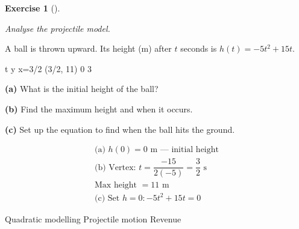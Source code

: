 \documentclass[
  letterpaper,
  DIV=11,
  numbers=noendperiod]{scrreprt}
\theoremstyle{definition}
\newtheorem{exercise}{Exercise}[chapter]
\theoremstyle{remark}
\begin{document}
\begin{exercise}[]\protect\hypertarget{exr-u7-30}{}\label{exr-u7-30}

\emph{Analyse the projectile model.}

A ball is thrown upward. Its height (m) after \(t\) seconds is
\(h(t) = -5t^2 + 15t\).

t y x=3/2 (3/2, 11) 0 3

\textbf{(a)} What is the initial height of the ball?

\textbf{(b)} Find the maximum height and when it occurs.

\textbf{(c)} Set up the equation to find when the ball hits the ground.

\begin{tcolorbox}[enhanced jigsaw, opacitybacktitle=0.6, coltitle=black, arc=.35mm, colframe=quarto-callout-tip-color-frame, colback=white, bottomrule=.15mm, left=2mm, colbacktitle=quarto-callout-tip-color!10!white, titlerule=0mm, opacityback=0, title=\textcolor{quarto-callout-tip-color}{\faLightbulb}\hspace{0.5em}{🔍 View Solution}, leftrule=.75mm, breakable, rightrule=.15mm, bottomtitle=1mm, toptitle=1mm, toprule=.15mm]

\[
\begin{aligned}
\text{(a) } h(0) = 0 \text{ m — initial height} \\[4pt] \text{(b) Vertex: } t = \dfrac{-15}{2(-5)} = \dfrac{3}{2} \text{ s} \\[4pt] \text{Max height } = 11 \text{ m} \\[4pt] \text{(c) Set } h = 0: -5t^2 + 15t = 0
\end{aligned}
\]

\end{tcolorbox}

{Quadratic modelling} {Projectile motion} {Revenue}

\end{exercise}
\end{document}

